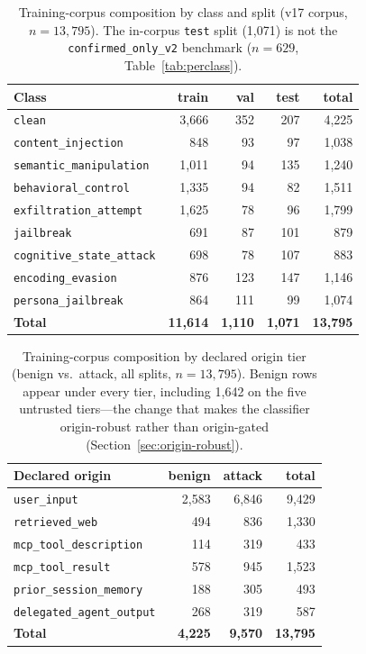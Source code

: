 \documentclass{article}
\begin{document}
\begin{table}[h]
\centering
\small
\caption{Training-corpus composition by class and split (v17 corpus, $n=13{,}795$). The in-corpus \texttt{test} split (1{,}071) is not the \texttt{confirmed\_only\_v2} benchmark ($n=629$, Table~\ref{tab:perclass}).}
\label{tab:corpusclass}
\begin{tabular}{lrrrr}
\toprule
\textbf{Class} & \textbf{train} & \textbf{val} & \textbf{test} & \textbf{total} \\
\midrule
\texttt{clean} & 3{,}666 & 352 & 207 & 4{,}225 \\
\texttt{content\_injection} & 848 & 93 & 97 & 1{,}038 \\
\texttt{semantic\_manipulation} & 1{,}011 & 94 & 135 & 1{,}240 \\
\texttt{behavioral\_control} & 1{,}335 & 94 & 82 & 1{,}511 \\
\texttt{exfiltration\_attempt} & 1{,}625 & 78 & 96 & 1{,}799 \\
\texttt{jailbreak} & 691 & 87 & 101 & 879 \\
\texttt{cognitive\_state\_attack} & 698 & 78 & 107 & 883 \\
\texttt{encoding\_evasion} & 876 & 123 & 147 & 1{,}146 \\
\texttt{persona\_jailbreak} & 864 & 111 & 99 & 1{,}074 \\
\midrule
\textbf{Total} & \textbf{11{,}614} & \textbf{1{,}110} & \textbf{1{,}071} & \textbf{13{,}795} \\
\bottomrule
\end{tabular}
\end{table}

\begin{table}[h]
\centering
\small
\caption{Training-corpus composition by declared origin tier (benign vs.\ attack, all splits, $n=13{,}795$). Benign rows appear under every tier, including 1{,}642 on the five untrusted tiers---the change that makes the classifier origin-robust rather than origin-gated (Section~\ref{sec:origin-robust}).}
\label{tab:corpusorigin}
\begin{tabular}{lrrr}
\toprule
\textbf{Declared origin} & \textbf{benign} & \textbf{attack} & \textbf{total} \\
\midrule
\texttt{user\_input} & 2{,}583 & 6{,}846 & 9{,}429 \\
\texttt{retrieved\_web} & 494 & 836 & 1{,}330 \\
\texttt{mcp\_tool\_description} & 114 & 319 & 433 \\
\texttt{mcp\_tool\_result} & 578 & 945 & 1{,}523 \\
\texttt{prior\_session\_memory} & 188 & 305 & 493 \\
\texttt{delegated\_agent\_output} & 268 & 319 & 587 \\
\midrule
\textbf{Total} & \textbf{4{,}225} & \textbf{9{,}570} & \textbf{13{,}795} \\
\bottomrule
\end{tabular}
\end{table}
\end{document}

